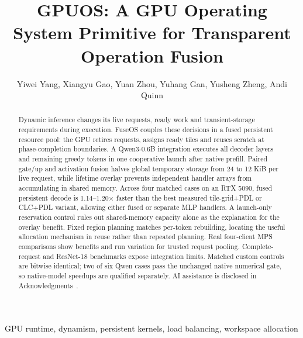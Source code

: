\documentclass[conference,10pt,letterpaper]{IEEEtran}
\begin{document}
\title{GPUOS: A GPU Operating System Primitive for Transparent Operation Fusion}
\author{Yiwei Yang, Xiangyu Gao, Yuan Zhou, Yuhang Gan, Yusheng Zheng, Andi Quinn}
\maketitle
\begin{abstract}
Dynamic inference changes its live requests, ready work and transient-storage
requirements during execution. FuseOS couples these decisions in a fused
persistent resource pool: the GPU retires requests, assigns ready tiles and
reuses scratch at phase-completion boundaries. A Qwen3-0.6B integration executes
all decoder layers and remaining greedy tokens in one cooperative launch after
native prefill. Paired gate/up and activation fusion halves global temporary
storage from 24 to 12 KiB per live request, while lifetime overlay prevents
independent handler arrays from accumulating in shared memory. Across four
matched cases on an RTX 5090, fused persistent decode is 1.14--1.20$\times$
faster than the best measured tile-grid+PDL or CLC+PDL variant, allowing either
fused or separate MLP handlers. A launch-only reservation control rules out
shared-memory capacity alone as the explanation for the overlay benefit.
Fixed region planning matches per-token rebuilding, locating the useful
allocation mechanism in reuse rather than repeated planning. Real four-client
MPS comparisons show benefits and run variation for trusted request pooling.
Complete-request and ResNet-18 benchmarks expose integration limits. Matched
custom controls are bitwise identical; two of six Qwen cases pass the unchanged
native numerical gate, so native-model speedups are qualified separately.
AI assistance is disclosed in Acknowledgments~\cite{Codex}.
\end{abstract}
\begin{IEEEkeywords}
GPU runtime, dynamism, persistent kernels, load balancing, workspace allocation
\end{IEEEkeywords}








\end{document}
